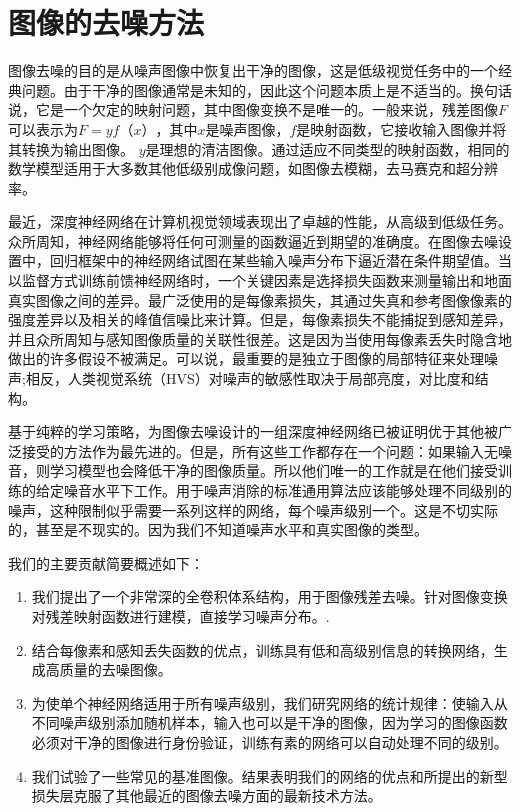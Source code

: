 \chapter{图像的去噪方法}
\label{chap:Denoising}

图像去噪的目的是从噪声图像中恢复出干净的图像，这是低级视觉任务中的一个经典问题。由于干净的图像通常是未知的，因此这个问题本质上是不适当的。换句话说，它是一个欠定的映射问题，其中图像变换不是唯一的。一般来说，残差图像$ F $可以表示为$ F = yf（x）$，其中$ x $是噪声图像，$ f $是映射函数，它接收输入图像并将其转换为输出图像。 $ y $是理想的清洁图像。通过适应不同类型的映射函数，相同的数学模型适用于大多数其他低级别成像问题，如图像去模糊，去马赛克和超分辨率。

最近，深度神经网络在计算机视觉领域表现出了卓越的性能，从高级到低级任务。众所周知，神经网络能够将任何可测量的函数逼近到期望的准确度\cite{Hornik1989}。在图像去噪设置中，回归框架中的神经网络试图在某些输入噪声分布下逼近潜在条件期望值。当以监督方式训练前馈神经网络时，一个关键因素是选择损失函数来测量输出和地面真实图像之间的差异。最广泛使用的是每像素损失，其通过失真和参考图像像素的强度差异以及相关的峰值信噪比\cite{Wang2004}来计算。但是，每像素损失不能捕捉到感知差异，并且众所周知与感知图像质量的关联性很差\cite{Zhao2015,Zhanga2012}。这是因为当使用每像素丢失时隐含地做出的许多假设不被满足。可以说，最重要的是独立于图像的局部特征来处理噪声;相反，人类视觉系统（HVS）对噪声的敏感性取决于局部亮度，对比度和结构\citep{Wang2004}。

基于纯粹的学习策略，为图像去噪设计的一组深度神经网络已被证明优于其他被广泛接受的方法作为最先进的\cite{Burger2012}。但是，所有这些工作都存在一个问题：如果输入无噪音，则学习模型也会降低干净的图像质量。所以他们唯一的工作就是在他们接受训练的给定噪音水平下工作。用于噪声消除的标准通用算法应该能够处理不同级别的噪声，这种限制似乎需要一系列这样的网络，每个噪声级别一个。这是不切实际的，甚至是不现实的。因为我们不知道噪声水平和真实图像的类型。

我们的主要贡献简要概述如下：

\begin{enumerate}

\item 我们提出了一个非常深的全卷积体系结构，用于图像残差去噪。针对图像变换对残差映射函数进行建模，直接学习噪声分布。. 

\item 结合每像素和感知丢失函数的优点，训练具有低和高级别信息的转换网络，生成高质量的去噪图像。

\item 为使单个神经网络适用于所有噪声级别，我们研究网络的统计规律：使输入从不同噪声级别添加随机样本，输入也可以是干净的图像，因为学习的图像函数必须对干净的图像进行身份验证，训练有素的网络可以自动处理不同的级别。

\item 我们试验了一些常见的基准图像。结果表明我们的网络的优点和所提出的新型损失层克服了其他最近的图像去噪方面的最新技术方法。

\end{enumerate}

